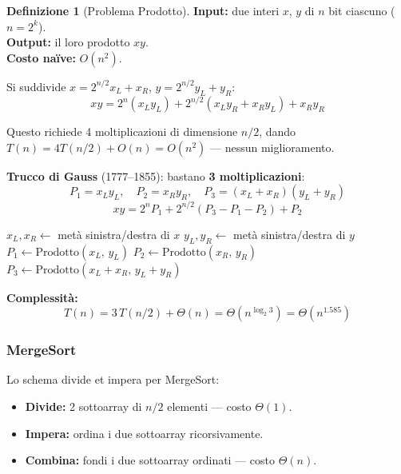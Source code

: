 \documentclass[a4paper, 11pt]{article}
\theoremstyle{definition}
\newtheorem{definizione}{Definizione}[section]
\theoremstyle{remark}
\theoremstyle{remark}
\begin{document}
	\begin{definizione}[Problema Prodotto]
		\textbf{Input:} due interi $x$, $y$ di $n$ bit ciascuno ($n = 2^k$).\\
		\textbf{Output:} il loro prodotto $xy$.\\
		\textbf{Costo naïve:} $O(n^2)$.
	\end{definizione}
	
	Si suddivide $x = 2^{n/2}x_L + x_R$, $y = 2^{n/2}y_L + y_R$:
	\[
	xy = 2^n(x_L y_L) + 2^{n/2}(x_L y_R + x_R y_L) + x_R y_R
	\]
	
	Questo richiede 4 moltiplicazioni di dimensione $n/2$, dando
	$T(n) = 4T(n/2) + O(n) = O(n^2)$ — nessun miglioramento.
	
	\begin{hardnote}
		\textbf{Trucco di Gauss} (1777--1855): bastano \textbf{3 moltiplicazioni}:
		\[
		P_1 = x_L y_L,\quad P_2 = x_R y_R,\quad
		P_3 = (x_L+x_R)(y_L+y_R)
		\]
		\[
		xy = 2^n P_1 + 2^{n/2}(P_3 - P_1 - P_2) + P_2
		\]
	\end{hardnote}
	
	\begin{algorithm}[H]
		\caption{Prodotto($x$, $y$)}
		$x_L, x_R \gets$ metà sinistra/destra di $x$
		$y_L, y_R \gets$ metà sinistra/destra di $y$\;
		$P_1 \gets \text{Prodotto}(x_L,\,y_L)$\;
		$P_2 \gets \text{Prodotto}(x_R,\,y_R)$
		$P_3 \gets \text{Prodotto}(x_L+x_R,\,y_L+y_R)$\;
	\end{algorithm}
	
	\begin{softnote}
		\textbf{Complessità:}
		\[
		T(n) = 3\,T(n/2) + \Theta(n) = \Theta(n^{\log_2 3})
		= \Theta(n^{1.585})
		\]
	\end{softnote}
	
	\subsubsection{MergeSort}
	
	Lo schema divide et impera per MergeSort:
	\begin{itemize}
		\item \textbf{Divide:} 2 sottoarray di $n/2$ elementi — costo $\Theta(1)$.
		\item \textbf{Impera:} ordina i due sottoarray ricorsivamente.
		\item \textbf{Combina:} fondi i due sottoarray ordinati — costo $\Theta(n)$.
	\end{itemize}
	
\end{document}
